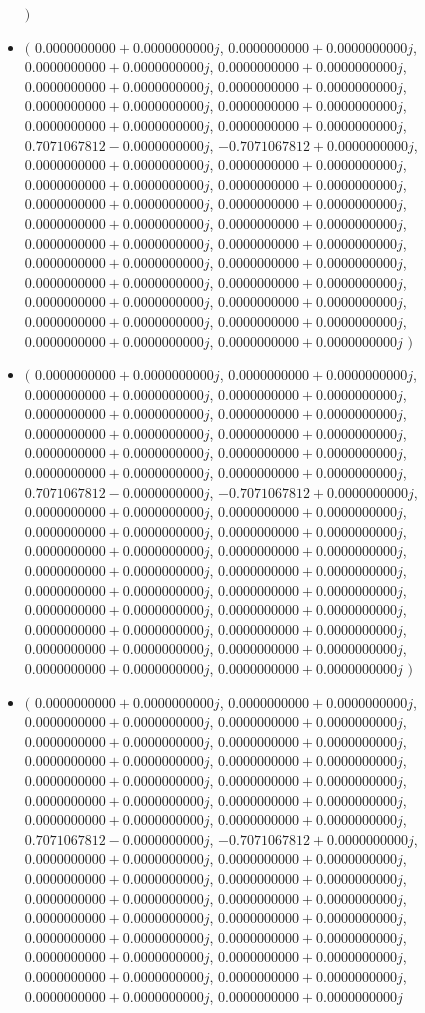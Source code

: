 \documentclass[14pt,a4paper]{article}
\begin{document}
\begin{itemize}
$\big)$
\item
$\big($
$0.0000000000+0.0000000000j$, $0.0000000000+0.0000000000j$, $0.0000000000+0.0000000000j$, $0.0000000000+0.0000000000j$, $0.0000000000+0.0000000000j$, $0.0000000000+0.0000000000j$, $0.0000000000+0.0000000000j$, $0.0000000000+0.0000000000j$, $0.0000000000+0.0000000000j$, $0.0000000000+0.0000000000j$, $0.7071067812-0.0000000000j$, $-0.7071067812+0.0000000000j$, $0.0000000000+0.0000000000j$, $0.0000000000+0.0000000000j$, $0.0000000000+0.0000000000j$, $0.0000000000+0.0000000000j$, $0.0000000000+0.0000000000j$, $0.0000000000+0.0000000000j$, $0.0000000000+0.0000000000j$, $0.0000000000+0.0000000000j$, $0.0000000000+0.0000000000j$, $0.0000000000+0.0000000000j$, $0.0000000000+0.0000000000j$, $0.0000000000+0.0000000000j$, $0.0000000000+0.0000000000j$, $0.0000000000+0.0000000000j$, $0.0000000000+0.0000000000j$, $0.0000000000+0.0000000000j$, $0.0000000000+0.0000000000j$, $0.0000000000+0.0000000000j$, $0.0000000000+0.0000000000j$, $0.0000000000+0.0000000000j$
$\big)$
\item
$\big($
$0.0000000000+0.0000000000j$, $0.0000000000+0.0000000000j$, $0.0000000000+0.0000000000j$, $0.0000000000+0.0000000000j$, $0.0000000000+0.0000000000j$, $0.0000000000+0.0000000000j$, $0.0000000000+0.0000000000j$, $0.0000000000+0.0000000000j$, $0.0000000000+0.0000000000j$, $0.0000000000+0.0000000000j$, $0.0000000000+0.0000000000j$, $0.0000000000+0.0000000000j$, $0.7071067812-0.0000000000j$, $-0.7071067812+0.0000000000j$, $0.0000000000+0.0000000000j$, $0.0000000000+0.0000000000j$, $0.0000000000+0.0000000000j$, $0.0000000000+0.0000000000j$, $0.0000000000+0.0000000000j$, $0.0000000000+0.0000000000j$, $0.0000000000+0.0000000000j$, $0.0000000000+0.0000000000j$, $0.0000000000+0.0000000000j$, $0.0000000000+0.0000000000j$, $0.0000000000+0.0000000000j$, $0.0000000000+0.0000000000j$, $0.0000000000+0.0000000000j$, $0.0000000000+0.0000000000j$, $0.0000000000+0.0000000000j$, $0.0000000000+0.0000000000j$, $0.0000000000+0.0000000000j$, $0.0000000000+0.0000000000j$
$\big)$
\item
$\big($
$0.0000000000+0.0000000000j$, $0.0000000000+0.0000000000j$, $0.0000000000+0.0000000000j$, $0.0000000000+0.0000000000j$, $0.0000000000+0.0000000000j$, $0.0000000000+0.0000000000j$, $0.0000000000+0.0000000000j$, $0.0000000000+0.0000000000j$, $0.0000000000+0.0000000000j$, $0.0000000000+0.0000000000j$, $0.0000000000+0.0000000000j$, $0.0000000000+0.0000000000j$, $0.0000000000+0.0000000000j$, $0.0000000000+0.0000000000j$, $0.7071067812-0.0000000000j$, $-0.7071067812+0.0000000000j$, $0.0000000000+0.0000000000j$, $0.0000000000+0.0000000000j$, $0.0000000000+0.0000000000j$, $0.0000000000+0.0000000000j$, $0.0000000000+0.0000000000j$, $0.0000000000+0.0000000000j$, $0.0000000000+0.0000000000j$, $0.0000000000+0.0000000000j$, $0.0000000000+0.0000000000j$, $0.0000000000+0.0000000000j$, $0.0000000000+0.0000000000j$, $0.0000000000+0.0000000000j$, $0.0000000000+0.0000000000j$, $0.0000000000+0.0000000000j$, $0.0000000000+0.0000000000j$, $0.0000000000+0.0000000000j$

\end{itemize}
\end{document}
